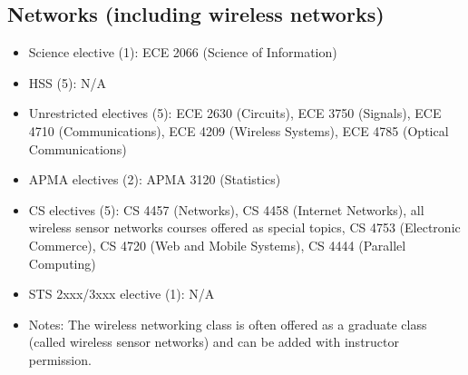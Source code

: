\documentclass[10pt,letter,twocolumn]{book}
\newenvironment{itemlist}{
\begin{itemize}
\setlength{\itemsep}{0pt}
\setlength{\parskip}{0pt}}
{\end{itemize}}
\begin{document}
\subsection{Networks (including wireless networks)}
\begin{itemlist}
\item Science elective (1): ECE 2066 (Science of Information)
\item HSS (5): N/A
\item Unrestricted electives (5): ECE 2630 (Circuits), ECE 3750
  (Signals), ECE 4710 (Communications), ECE 4209 (Wireless Systems),
  ECE 4785 (Optical Communications)
\item APMA electives (2): APMA 3120 (Statistics)
\item CS electives (5): CS 4457 (Networks), CS 4458 (Internet
  Networks), all wireless sensor networks courses offered as special
  topics, CS 4753 (Electronic Commerce), CS 4720 (Web and Mobile
  Systems), CS 4444 (Parallel Computing)
\item STS 2xxx/3xxx elective (1): N/A
\item Notes: The wireless networking class is often offered as a graduate class (called wireless sensor networks) and can be added with instructor permission. 
\end{itemlist}
\end{document}
